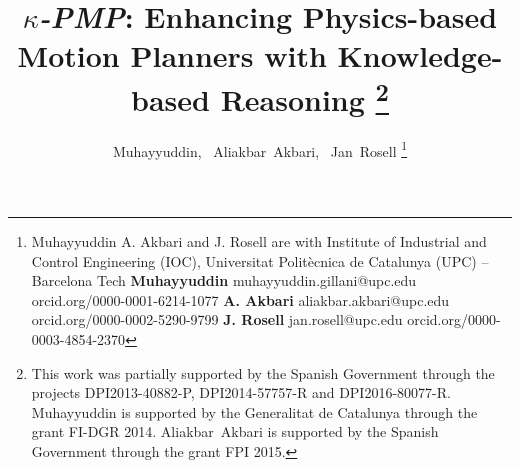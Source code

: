 \documentclass[twocolumn]{svjour3}          %
\begin{document}
\sloppy
%
\title{\textit{$\kappa$-PMP}: Enhancing Physics-based Motion Planners with Knowledge-based Reasoning \thanks{This work was partially supported by the Spanish Government through the projects 
\mbox{DPI2013-40882-P},  \mbox{DPI2014-57757-R} and  \mbox{DPI2016-80077-R}. Muhayyuddin is supported by the Generalitat de Catalunya 
through the grant FI-DGR 2014.
Aliakbar~Akbari is supported by the Spanish Government through the grant FPI 2015.}}
\author{Muhayyuddin,~%
        Aliakbar~Akbari,~%
        Jan~Rosell%
\thanks{Muhayyuddin A. Akbari and J. Rosell are with Institute of Industrial and Control Engineering (IOC), Universitat Polit\`ecnica de Catalunya (UPC) -- Barcelona Tech\newline
\newline
\textbf{Muhayyuddin} \newline
muhayyuddin.gillani@upc.edu\newline
orcid.org/0000-0001-6214-1077\newline
\newline
\textbf{A. Akbari}\newline
aliakbar.akbari@upc.edu\newline
orcid.org/0000-0002-5290-9799\newline
\newline
\textbf{J. Rosell}\newline
jan.rosell@upc.edu\newline
orcid.org/0000-0003-4854-2370
}%
}
\maketitle
\end{document}
